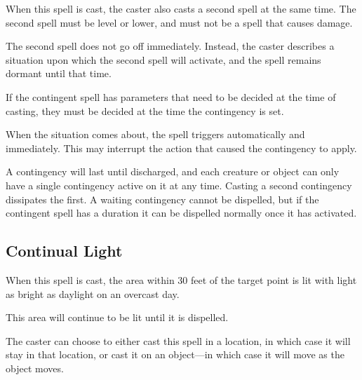 \begin{multicols*}{2}
When this spell is cast, the caster also casts a second spell at the same time. The second spell must be  level or lower, and must not be a spell that causes damage.

The second spell does not go off immediately. Instead, the caster describes a situation upon which the second spell will activate, and the spell remains dormant until that time.

If the contingent spell has parameters that need to be decided at the time of casting, they must be decided at the time the contingency is set.

When the situation comes about, the spell triggers automatically and immediately. This may interrupt the action that caused the contingency to apply.


A contingency will last until discharged, and each creature or object can only have a single contingency active on it at any time. Casting a second contingency dissipates the first. A waiting contingency cannot be dispelled, but if the contingent spell has a duration it can be dispelled normally once it has activated.

\subsection{Continual Light}\label{spell:Continual Light}

When this spell is cast, the area within 30 feet of the target point is lit with light as bright as daylight on an overcast day.

This area will continue to be lit until it is dispelled.

The caster can choose to either cast this spell in a location, in which case it will stay in that location, or cast it on an object—in which case it will move as the object moves.


\end{multicols*}
